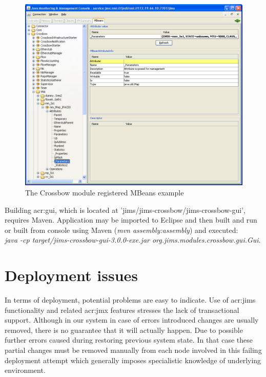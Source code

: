 \documentclass[11pt,openany]{book}
\begin{document}
      \begin{figure}[H]
        \centering
        \includegraphics[width=1.0\textwidth]{img/impl/jconsole.png}

        \caption{The Crossbow module registered MBeans example}
        \label{fig:impl:xbow-jconsole}
      \end{figure}

      Building \gls{acr:gui}, which is located at 'jims/jims-crossbow/jims-crossbow-gui', requires Maven.
      Application may be imported to Eclipse and then built and run or built from console using Maven (\textit{mvn
      assembly:assembly}) and executed: \\
	\textit{java -cp target/jims-crossbow-gui-3.0.0-exe.jar org.jims.modules.crossbow.gui.Gui}.


    \section{Deployment issues}
    \label{sec:impl:problems}
		
    In terms of deployment, potential problems are easy to indicate. Use of \gls{acr:jims} functionality and related
    \gls{acr:jmx} features stresses the lack of transactional support. Although in our system in case of errors
    introduced changes are usually removed, there is no guarantee that it will actually happen. Due to possible further
    errors caused during restoring previous system state. In that case these partial changes must be removed manually
    from each node involved in this failing deployment attempt which generally imposes specialistic knowledge of
    underlying environment.
\end{document}
